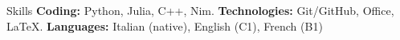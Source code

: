 \begin{rubric}{Skills}
\entry*[]
\textbf{Coding:} Python, Julia, C++, Nim.
\entry*[]
\textbf{Technologies:} Git/GitHub, Office, LaTeX.
\entry*[]
\textbf{Languages:} Italian (native), English (C1), French (B1)
\end{rubric}
